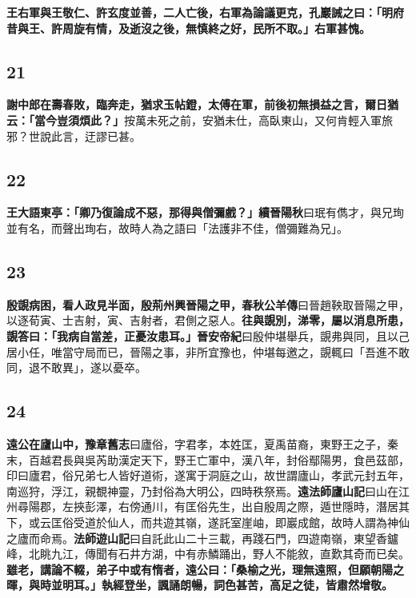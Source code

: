 \textbf{王右軍與王敬仁、許玄度並善，二人亡後，右軍為論議更克，孔巖誡之曰：「明府昔與王、許周旋有情，及逝沒之後，無慎終之好，民所不取。」右軍甚愧。}

\subsection*{21}

\textbf{謝中郎在壽春敗，臨奔走，猶求玉帖鐙，太傅在軍，前後初無損益之言，爾日猶云：「當今豈須煩此？」}{\footnotesize 按萬未死之前，安猶未仕，高臥東山，又何肯輕入軍旅邪？世說此言，迂謬已甚。}

\subsection*{22}

\textbf{王大語東亭：「卿乃復論成不惡，那得與僧彌戲？」}{\footnotesize \textbf{續晉陽秋}曰珉有儁才，與兄珣並有名，而聲出珣右，故時人為之語曰「法護非不佳，僧彌難為兄」。}

\subsection*{23}

\textbf{殷覬病困，看人政見半面，殷荊州興晉陽之甲，}{\footnotesize \textbf{春秋公羊傳}曰晉趙鞅取晉陽之甲，以逐荀寅、士吉射，寅、吉射者，君側之惡人。}\textbf{往與覬別，涕零，屬以消息所患，覬答曰：「我病自當差，正憂汝患耳。」}{\footnotesize \textbf{晉安帝紀}曰殷仲堪舉兵，覬弗與同，且以己居小任，唯當守局而已，晉陽之事，非所宜豫也，仲堪每邀之，覬輒曰「吾進不敢同，退不敢異」，遂以憂卒。}

\subsection*{24}

\textbf{遠公在廬山中，}{\footnotesize \textbf{豫章舊志}曰廬俗，字君孝，本姓匡，夏禹苗裔，東野王之子，秦末，百越君長與吳芮助漢定天下，野王亡軍中，漢八年，封俗鄢陽男，食邑茲部，印曰廬君，俗兄弟七人皆好道術，遂寓于洞庭之山，故世謂廬山，孝武元封五年，南巡狩，浮江，親覩神靈，乃封俗為大明公，四時秩祭焉。\textbf{遠法師廬山記}曰山在江州尋陽郡，左挾彭澤，右傍通川，有匡俗先生，出自殷周之際，遁世隱時，潛居其下，或云匡俗受道於仙人，而共遊其嶺，遂託室崖岫，即巖成館，故時人謂為神仙之廬而命焉。\textbf{法師遊山記}曰自託此山二十三載，再踐石門，四遊南嶺，東望香鑪峰，北眺九江，傳聞有石井方湖，中有赤鱗踊出，野人不能敘，直歎其奇而已矣。}\textbf{雖老，講論不輟，弟子中或有惰者，遠公曰：「桑榆之光，理無遠照，但願朝陽之暉，與時並明耳。」執經登坐，諷誦朗暢，詞色甚苦，高足之徒，皆肅然增敬。}

